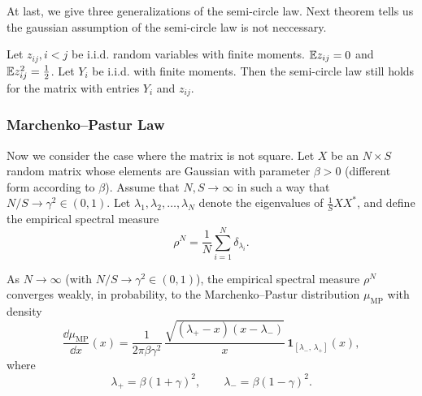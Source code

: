 At last, we give three generalizations of the semi-circle law. Next theorem tells us the gaussian assumption of the semi-circle law is not neccessary.
\begin{thm}[Generalization]
    Let $z_{ij}, i<j$ be i.i.d. random variables with finite moments. $\mathbb{E} z_{ij} = 0$ and $\mathbb{E} z_{ij}^2 = \frac{1}{2}$. Let $Y_i$ be i.i.d. with finite moments. Then the semi-circle law still holds for the matrix with entries $Y_i$ and $z_{ij}$.
\end{thm}

\subsubsection{Marchenko–Pastur Law}
Now we consider the case where the matrix is not square.
Let $X$ be an $N\times S$ random matrix whose elements are Gaussian with parameter $\beta > 0$ (different form according to $\beta$).
Assume that $N, S\to\infty$ in such a way that $N/S \to \gamma^2 \in (0,1)$.
Let $\lambda_1, \lambda_2,\ldots, \lambda_N$ denote the eigenvalues of $\frac{1}{S}XX^*$, and define the empirical spectral measure
\[
\rho^N = \frac{1}{N}\sum_{i=1}^N \delta_{\lambda_i}.
\]
 
\begin{thm}
As $N\to\infty$ (with $N/S\to \gamma^2\in(0,1)$), the empirical spectral measure $\rho^N$ converges weakly, in probability, to the Marchenko--Pastur distribution $\mu_{\mathrm{MP}}$ with density
\[
\frac{\dd\mu_{\mathrm{MP}}}{\dd x}(x)
= \frac{1}{2\pi\beta\gamma^2}\,
\frac{\sqrt{(\lambda_+ - x)(x-\lambda_-)}}{x}\,
\mathbf{1}_{[\lambda_-,\,\lambda_+]}(x),
\]
where
\[
\lambda_+ = \beta(1+\gamma)^2, \qquad
\lambda_- = \beta(1-\gamma)^2.
\]
\end{thm}

